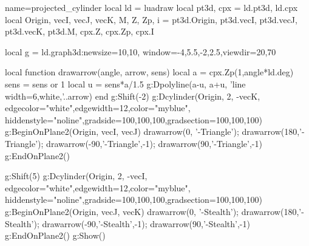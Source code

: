 \documentclass{standalone} %
\begin{document}
\begin{luadraw}{name=projected_cylinder}
    local ld = luadraw
    local pt3d, cpx = ld.pt3d, ld.cpx
    local Origin, vecI, vecJ, vecK, M, Z, Zp, i  = pt3d.Origin, pt3d.vecI, pt3d.vecJ, pt3d.vecK, pt3d.M, cpx.Z, cpx.Zp, cpx.I
    
    local g = ld.graph3d:new{size={10,10}, window={-4,5.5,-2,2.5},viewdir={20,70}}
    
    local function drawarrow(angle, arrow, sens)
        local a = cpx.Zp(1,angle*ld.deg)
        sens = sens or 1
        local u = sens*a/1.5
        g:Dpolyline({a-u, a+u}, 'line width=6,white,'..arrow)
    end
    g:Shift(-2)
    g:Dcylinder(Origin, 2, -vecK, {edgecolor="white",edgewidth=12,color="myblue", hiddenstyle="noline",gradside={100,100,100},gradsection={100,100,100}})
    g:BeginOnPlane2({Origin, vecI, vecJ})
        drawarrow(0, '-Triangle'); drawarrow(180,'-Triangle'); 
        drawarrow(-90,'-Triangle',-1); drawarrow(90,'-Triangle',-1)
    g:EndOnPlane2()
    
    g:Shift(5)
    g:Dcylinder(Origin, 2, -vecI, {edgecolor="white",edgewidth=12,color="myblue", hiddenstyle="noline",gradside={100,100,100},gradsection={100,100,100}})
    g:BeginOnPlane2({Origin, vecJ, vecK})
        drawarrow(0, '-Stealth'); drawarrow(180,'-Stealth'); 
        drawarrow(-90,'-Stealth',-1); drawarrow(90,'-Stealth',-1)
    g:EndOnPlane2()    
    g:Show()
\end{luadraw}
\end{document}

